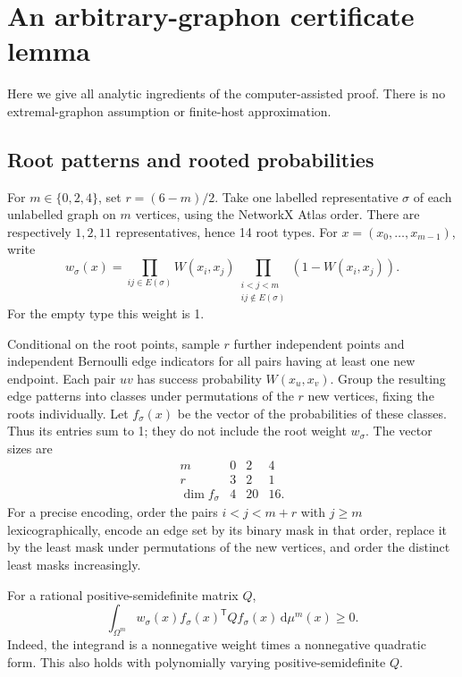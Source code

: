 \documentclass[11pt]{article}
\newcommand{\dd}{\,\mathrm d}
\begin{document}
\section{An arbitrary-graphon certificate lemma}

Here we give all analytic ingredients of the computer-assisted proof.
There is no extremal-graphon assumption or finite-host approximation.

\subsection{Root patterns and rooted probabilities}

For $m\in\{0,2,4\}$, set $r=(6-m)/2$.  Take one labelled representative
$\sigma$ of each unlabelled graph on $m$ vertices, using the NetworkX Atlas
order.  There are respectively $1,2,11$ representatives, hence 14 root types.
For $x=(x_0,\ldots,x_{m-1})$, write
\[
 w_\sigma(x)=\prod_{ij\in E(\sigma)}W(x_i,x_j)
 \prod_{\substack{i<j<m\\ij\notin E(\sigma)}}(1-W(x_i,x_j)).
\]
For the empty type this weight is 1.

Conditional on the root points, sample $r$ further independent points and
independent Bernoulli edge indicators for all pairs having at least one
new endpoint.  Each pair $uv$ has success probability $W(x_u,x_v)$.
Group the resulting edge patterns into classes under permutations of the
$r$ new vertices, fixing the roots individually.  Let $f_\sigma(x)$ be the
vector of the probabilities of these classes.  Thus its entries sum to 1;
they do not include the root weight $w_\sigma$.  The vector sizes are
\[
 \begin{array}{c|ccc}m&0&2&4\\ \hline
 r&3&2&1\\ \dim f_\sigma&4&20&16.\end{array}
\]
For a precise encoding, order the pairs $i<j<m+r$ with $j\ge m$
lexicographically, encode an edge set by its binary mask in that order,
replace it by the least mask under permutations of the new vertices, and
order the distinct least masks increasingly.

For a rational positive-semidefinite matrix $Q$,
\begin{equation}
 \int_{\Omega^m}w_\sigma(x)f_\sigma(x)^{\mathsf T}
 Qf_\sigma(x)\dd\mu^m(x)\ge0.\label{eq:square}
\end{equation}
Indeed, the integrand is a nonnegative weight times a nonnegative quadratic
form.  This also holds with polynomially varying positive-semidefinite $Q$.
\end{document}
